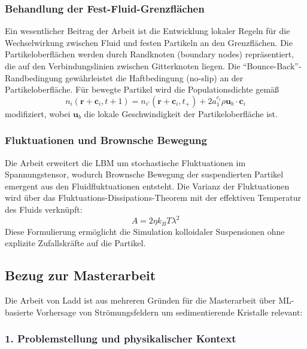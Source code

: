 \documentclass[a4paper,12pt]{article}
\begin{document}
\subsubsection*{Behandlung der Fest-Fluid-Grenzfl\"achen}

Ein wesentlicher Beitrag der Arbeit ist die Entwicklung lokaler Regeln f\"ur die Wechselwirkung zwischen Fluid und festen Partikeln an den Grenzfl\"achen. Die Partikeloberfl\"achen werden durch Randknoten (boundary nodes) repr\"asentiert, die auf den Verbindungslinien zwischen Gitterknoten liegen. Die ``Bounce-Back''-Randbedingung gew\"ahrleistet die Haftbedingung (no-slip) an der Partikeloberfl\"ache. F\"ur bewegte Partikel wird die Populationsdichte gem\"a{\ss}
\begin{equation}
n_i(\mathbf{r} + \mathbf{c}_i, t + 1) = n_{i'}(\mathbf{r} + \mathbf{c}_i, t_+) + 2a_1^{c_i} \rho \mathbf{u}_b \cdot \mathbf{c}_i
\end{equation}
modifiziert, wobei $\mathbf{u}_b$ die lokale Geschwindigkeit der Partikeloberfl\"ache ist.

\subsubsection*{Fluktuationen und Brownsche Bewegung}

Die Arbeit erweitert die LBM um stochastische Fluktuationen im Spannungstensor, wodurch Brownsche Bewegung der suspendierten Partikel emergent aus den Fluidfluktuationen entsteht. Die Varianz der Fluktuationen wird \"uber das Fluktuations-Dissipations-Theorem mit der effektiven Temperatur des Fluids verkn\"upft:
\begin{equation}
A = 2\eta k_B T \lambda^2
\end{equation}
Diese Formulierung erm\"oglicht die Simulation kolloidaler Suspensionen ohne explizite Zufallskr\"afte auf die Partikel.

\subsection*{Bezug zur Masterarbeit}

Die Arbeit von Ladd ist aus mehreren Gr\"unden f\"ur die Masterarbeit \"uber ML-basierte Vorhersage von Str\"omungsfeldern um sedimentierende Kristalle relevant:

\subsubsection*{1. Problemstellung und physikalischer Kontext}
\end{document}

